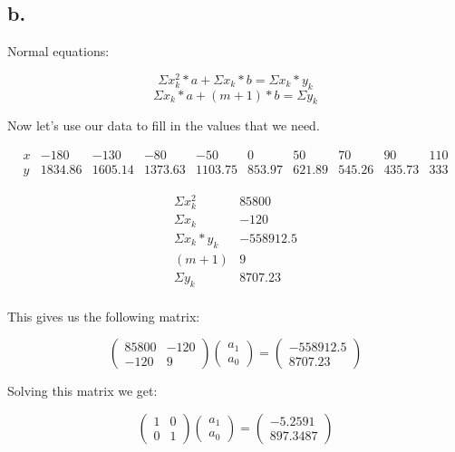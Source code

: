 \documentclass[]{article}
\begin{document}
\subsection{b.}\label{b.-1}

Normal equations:

\[\Sigma x_k^2*a + \Sigma x_k * b = \Sigma x_k * y_k\]
\[\Sigma x_k * a + (m + 1)*b = \Sigma y_k\]

Now let's use our data to fill in the values that we need.

\[
\begin{array}{c|c|c|c|c|c|c|c|c|c|} 
x & -180 & -130 & -80 & -50 & 0 & 50 & 70 & 90 & 110\\
y & 1834.86 & 1605.14 & 1373.63 & 1103.75 & 853.97 & 621.89 & 545.26 & 435.73 & 333
\end{array}
\]

\[
\begin{array}{c|c|} 
\Sigma x_k^2 & 85800\\
\Sigma x_k & -120\\
\Sigma x_k * y_k & -558912.5\\
(m + 1) & 9\\
\Sigma y_k & 8707.23\\
\end{array}
\]

This gives us the following matrix:

\[
\left(\begin{array}{cc} 
85800 & -120\\
-120 & 9
\end{array}\right)
\left(\begin{array}{c} 
a_1 \\
a_0 
\end{array}\right) =
\left(\begin{array}{c}
-558912.5 \\
8707.23 
\end{array}\right)
\]

Solving this matrix we get:

\[
\left(\begin{array}{cc} 
1 & 0\\
0 & 1
\end{array}\right)
\left(\begin{array}{c} 
a_1 \\
a_0 
\end{array}\right) =
\left(\begin{array}{c}
-5.2591 \\
897.3487 
\end{array}\right)
\]
\end{document}
